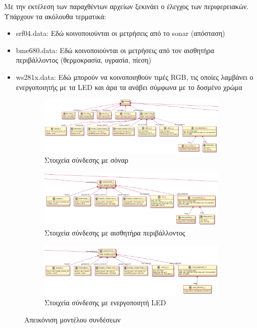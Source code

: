 Με την εκτέλεση των παραχθέντων αρχείων ξεκινάει ο έλεγχος των περιφερειακών. Υπάρχουν τα ακόλουθα τερματικά:

\begin{itemize}
	\item srf04.data: Εδώ κοινοποιούνται οι μετρήσεις από το sonar (απόσταση)
	\item bme680.data: Εδώ κοινοποιούνται οι μετρήσεις από τον αισθητήρα περιβάλλοντος (θερμοκρασία, υγρασία, πίεση)
	\item ws281x.data: Εδώ μπορούν να κοινοποιηθούν τιμές RGB, τις οποίες λαμβάνει ο ενεργοποιητής με τα LED και άρα τα ανάβει σύμφωνα με το δοσμένο χρώμα
\end{itemize}

\begin{figure}[!ht]
	\begin{subfigure}{\textwidth}
		\centering
		\includegraphics[width=\textwidth]{./images/chapter6/example1b1.png}
		\caption{Στοιχεία σύνδεσης με σόναρ}
		\label{fig:exmpl_1b1}
	\end{subfigure}
	
	\medskip
	
	\begin{subfigure}{\textwidth}
		\centering
		\includegraphics[width=\textwidth]{./images/chapter6/example1b2.png}
		\caption{Στοιχεία σύνδεσης με αισθητήρα περιβάλλοντος}
		\label{fig:exmpl_1b2}
	\end{subfigure}
	
	\medskip
	
	\begin{subfigure}{\textwidth}
		\centering
		\includegraphics[width=\textwidth]{./images/chapter6/example1b3.png}
		\caption{Στοιχεία σύνδεσης με ενεργοποιητή LED}
		\label{fig:exmpl_1b3}
	\end{subfigure}
	
	\caption{Απεικόνιση μοντέλου συνδέσεων}
	\label{fig:connections_model}
\end{figure}

\newpage